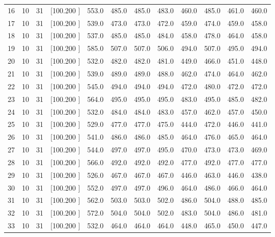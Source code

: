 \documentclass[12pt,a4paper]{article}
\begin{document}
\begin{center}
{\begin{tabular}{r r r r r r r r r r r r}
  16& 10& 31&[100.200   ]&   553.0&   485.0&   485.0&   483.0&   460.0&   485.0&   461.0&   460.0\\[-0.02in]
  17& 10& 31&[100.200   ]&   539.0&   473.0&   473.0&   472.0&   459.0&   474.0&   459.0&   458.0\\[-0.02in]
  18& 10& 31&[100.200   ]&   537.0&   485.0&   485.0&   484.0&   458.0&   478.0&   464.0&   458.0\\[-0.02in]
  19& 10& 31&[100.200   ]&   585.0&   507.0&   507.0&   506.0&   494.0&   507.0&   495.0&   494.0\\[-0.02in]
  20& 10& 31&[100.200   ]&   532.0&   482.0&   482.0&   481.0&   449.0&   466.0&   451.0&   448.0\\[-0.02in]
  21& 10& 31&[100.200   ]&   539.0&   489.0&   489.0&   488.0&   462.0&   474.0&   464.0&   462.0\\[-0.02in]
  22& 10& 31&[100.200   ]&   545.0&   494.0&   494.0&   494.0&   472.0&   480.0&   472.0&   472.0\\[-0.02in]
  23& 10& 31&[100.200   ]&   564.0&   495.0&   495.0&   495.0&   483.0&   495.0&   485.0&   482.0\\[-0.02in]
  24& 10& 31&[100.200   ]&   532.0&   484.0&   484.0&   483.0&   457.0&   462.0&   457.0&   450.0\\[-0.02in]
  25& 10& 31&[100.200   ]&   529.0&   477.0&   477.0&   475.0&   444.0&   472.0&   446.0&   441.0\\[-0.02in]
  26& 10& 31&[100.200   ]&   541.0&   486.0&   486.0&   485.0&   464.0&   476.0&   465.0&   464.0\\[-0.02in]
  27& 10& 31&[100.200   ]&   544.0&   497.0&   497.0&   495.0&   470.0&   473.0&   473.0&   469.0\\[-0.02in]
  28& 10& 31&[100.200   ]&   566.0&   492.0&   492.0&   492.0&   477.0&   492.0&   477.0&   477.0\\[-0.02in]
  29& 10& 31&[100.200   ]&   526.0&   467.0&   467.0&   467.0&   446.0&   463.0&   446.0&   438.0\\[-0.02in]
  30& 10& 31&[100.200   ]&   552.0&   497.0&   497.0&   496.0&   464.0&   486.0&   466.0&   464.0\\[-0.02in]
  31& 10& 31&[100.200   ]&   562.0&   503.0&   503.0&   502.0&   486.0&   504.0&   488.0&   485.0\\[-0.02in]
  32& 10& 31&[100.200   ]&   572.0&   504.0&   504.0&   502.0&   483.0&   504.0&   486.0&   481.0\\[-0.02in]
  33& 10& 31&[100.200   ]&   532.0&   464.0&   464.0&   464.0&   448.0&   465.0&   450.0&   447.0\\[-0.02in]

\end{tabular}}
\end{center}
\end{document}

